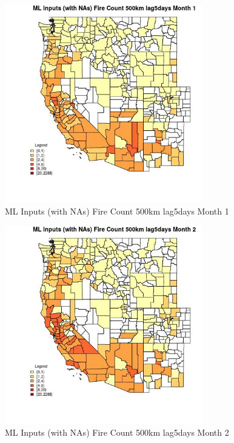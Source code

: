 \begin{figure} 
\centering  
\includegraphics[width=0.77\textwidth]{Code_Outputs/Report_ML_input_PM25_Step4_part_e_de_duplicated_aves_compiled_2019-05-20wNAs_CountyFire_Count_500km_lag5daysmedianMonth1.jpg} 
\caption{\label{fig:Report_ML_input_PM25_Step4_part_e_de_duplicated_aves_compiled_2019-05-20wNAsCountyFire_Count_500km_lag5daysmedianMonth1}ML Inputs (with NAs) Fire Count 500km lag5days Month 1} 
\end{figure} 
 

\begin{figure} 
\centering  
\includegraphics[width=0.77\textwidth]{Code_Outputs/Report_ML_input_PM25_Step4_part_e_de_duplicated_aves_compiled_2019-05-20wNAs_CountyFire_Count_500km_lag5daysmedianMonth2.jpg} 
\caption{\label{fig:Report_ML_input_PM25_Step4_part_e_de_duplicated_aves_compiled_2019-05-20wNAsCountyFire_Count_500km_lag5daysmedianMonth2}ML Inputs (with NAs) Fire Count 500km lag5days Month 2} 
\end{figure} 
 

